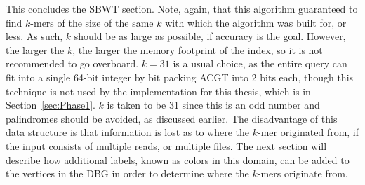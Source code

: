This concludes the SBWT section.
Note, again, that this algorithm guaranteed to find $k$-mers of the size of the same $k$ with which the algorithm was built for, or less.
As such, $k$ should be as large as possible, if accuracy is the goal.
However, the larger the $k$, the larger the memory footprint of the index, so it is not recommended to go overboard.
$k=31$ is a usual choice, as the entire query can fit into a single 64-bit integer by bit packing ACGT into 2 bits each, though this technique is not used by the implementation for this thesis, which is in Section~\ref{sec:Phase1}.
$k$ is taken to be 31 since this is an odd number and palindromes should be avoided, as discussed earlier.
The disadvantage of this data structure is that information is lost as to where the $k$-mer originated from, if the input consists of multiple reads, or multiple files.
The next section will describe how additional labels, known as colors in this domain, can be added to the vertices in the DBG in order to determine where the $k$-mers originate from.
